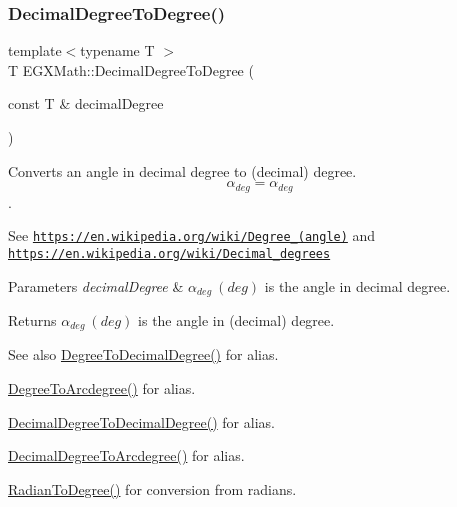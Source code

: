 \subsubsection{\texorpdfstring{Decimal\+Degree\+To\+Degree()}{DecimalDegreeToDegree()}}
{\footnotesize\ttfamily template$<$typename T $>$ \\
T E\+G\+X\+Math\+::\+Decimal\+Degree\+To\+Degree (\begin{DoxyParamCaption}\item[{const T \&}]{decimal\+Degree }\end{DoxyParamCaption})}



Converts an angle in decimal degree to (decimal) degree. \[\alpha_{deg}=\alpha_{deg}\]. 

See \href{https://en.wikipedia.org/wiki/Degree_(angle)}{\tt https\+://en.\+wikipedia.\+org/wiki/\+Degree\+\_\+(angle)} and \href{https://en.wikipedia.org/wiki/Decimal_degrees}{\tt https\+://en.\+wikipedia.\+org/wiki/\+Decimal\+\_\+degrees} 
\begin{DoxyParams}{Parameters}
{\em decimal\+Degree} & $\alpha_{deg}\ (deg)$ is the angle in decimal degree. \\
\hline
\end{DoxyParams}
\begin{DoxyReturn}{Returns}
$\alpha_{deg}\ (deg)$ is the angle in (decimal) degree. 
\end{DoxyReturn}
\begin{DoxySeeAlso}{See also}
\mbox{\hyperlink{group___e_g_x_math-_angle_conversions-_degree_ga568afc1d436d425bf5d4edea584aee08}{Degree\+To\+Decimal\+Degree()}} for alias. 

\mbox{\hyperlink{group___e_g_x_math-_angle_conversions-_degree_gac1b5f3b68f66c77a6df4ceef842c9b19}{Degree\+To\+Arcdegree()}} for alias. 

\mbox{\hyperlink{group___e_g_x_math-_angle_conversions-_decimal_degree_gafccf9cd779903872887978ab9d79661f}{Decimal\+Degree\+To\+Decimal\+Degree()}} for alias. 

\mbox{\hyperlink{group___e_g_x_math-_angle_conversions-_decimal_degree_gacdd463fcabffeb598ebda65b012ce743}{Decimal\+Degree\+To\+Arcdegree()}} for alias. 

\mbox{\hyperlink{group___e_g_x_math-_angle_conversions-_radian_ga25bbce6cdc1c3621f2a158d320e3bc45}{Radian\+To\+Degree()}} for conversion from radians. 
\end{DoxySeeAlso}
\mbox{\label{group___e_g_x_math-_angle_conversions-_decimal_degree_gac5a5255c8d120f71b60d8f60de1a1b6e}} 
